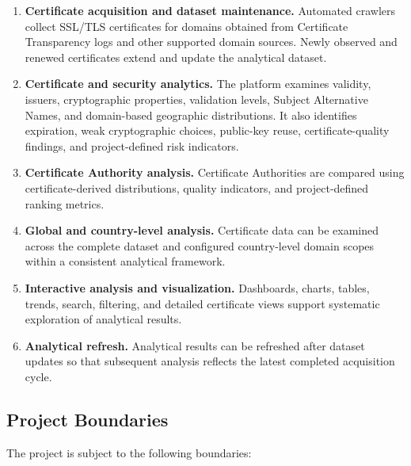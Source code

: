 \begin{enumerate}[label=\arabic*.,leftmargin=0.42in]
  \item \textbf{Certificate acquisition and dataset maintenance.} Automated crawlers collect SSL/TLS certificates for domains obtained from Certificate Transparency logs and other supported domain sources. Newly observed and renewed certificates extend and update the analytical dataset.

  \item \textbf{Certificate and security analytics.} The platform examines validity, issuers, cryptographic properties, validation levels, Subject Alternative Names, and domain-based geographic distributions. It also identifies expiration, weak cryptographic choices, public-key reuse, certificate-quality findings, and project-defined risk indicators.

  \item \textbf{Certificate Authority analysis.} Certificate Authorities are compared using certificate-derived distributions, quality indicators, and project-defined ranking metrics.

  \item \textbf{Global and country-level analysis.} Certificate data can be examined across the complete dataset and configured country-level domain scopes within a consistent analytical framework.

  \item \textbf{Interactive analysis and visualization.} Dashboards, charts, tables, trends, search, filtering, and detailed certificate views support systematic exploration of analytical results.

  \item \textbf{Analytical refresh.} Analytical results can be refreshed after dataset updates so that subsequent analysis reflects the latest completed acquisition cycle.
\end{enumerate}

\subsection{Project Boundaries}

The project is subject to the following boundaries:

